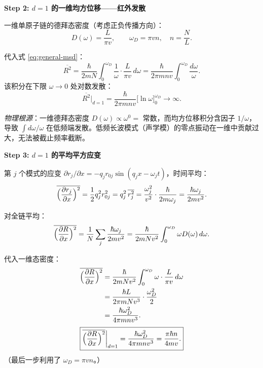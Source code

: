\begin{derivationbox}[标准解题过程]
\textbf{Step 2: $d=1$ 的一维均方位移——红外发散}

一维单原子链的德拜态密度（考虑正负传播方向）：
\begin{equation}
D(\omega) = \frac{L}{\pi v}, \qquad \omega_D = \pi vn, \quad n=\frac{N}{L}.
\end{equation}

代入式 \eqref{eq:general-msd}：
\begin{equation}
\overline{R^2} = \frac{\hbar}{2mN}\int_0^{\omega_D}\frac{1}{\omega}\cdot\frac{L}{\pi v}\,d\omega = \frac{\hbar}{2\pi mnv}\int_0^{\omega_D}\frac{d\omega}{\omega}.
\end{equation}
该积分在下限 $\omega\to0$ 处对数发散：
\begin{equation}
\boxed{\overline{R^2}\big|_{d=1} = \frac{\hbar}{2\pi mnv}\bigl[\ln\omega\bigr]_0^{\omega_D} \to \infty.}
\end{equation}

\textit{物理根源}：一维德拜态密度 $D(\omega)\propto\omega^0=$ 常数，而均方位移积分含因子 $1/\omega$，导致 $\int d\omega/\omega$ 在低频端发散。低频长波模式（声学模）的零点振动在一维中贡献过大，无法被截止频率截断。

\textbf{Step 3: $d=1$ 的平均平方应变}

第 $j$ 个模式的应变 $\partial r_j/\partial x = -q_j r_{0j}\sin(q_jx-\omega_jt)$，时间平均：
\begin{equation}
\overline{\Bigl(\frac{\partial r_j}{\partial x}\Bigr)^2} = \frac12 q_j^2 r_{0j}^2 = q_j^2\,\overline{r_j^2} = \frac{\omega_j^2}{v^2}\cdot\frac{\hbar}{2m\omega_j} = \frac{\hbar\omega_j}{2mv^2}.
\end{equation}

对全链平均：
\begin{equation}
\overline{\Bigl(\frac{\partial R}{\partial x}\Bigr)^2} = \frac{1}{N}\sum_j\frac{\hbar\omega_j}{2mv^2} = \frac{\hbar}{2mNv^2}\int_0^{\omega_D}\omega D(\omega)\,d\omega.
\end{equation}

代入一维态密度：
\begin{align}
    \overline{\Bigl(\frac{\partial R}{\partial x}\Bigr)^2} &= \frac{\hbar}{2mNv^2}\int_0^{\omega_D}\omega\cdot\frac{L}{\pi v}\,d\omega \nonumber\\
    &= \frac{\hbar L}{2\pi mNv^3}\cdot\frac{\omega_D^2}{2} \nonumber\\
    &= \frac{\hbar\omega_D^2}{4\pi mnv^3}.
\end{align}
\begin{equation}
\boxed{\overline{\Bigl(\frac{\partial R}{\partial x}\Bigr)^2}\bigg|_{d=1} = \frac{\hbar\omega_D^2}{4\pi mnv^3} = \frac{\pi\hbar n}{4m v}.}
\label{eq:1d-strain}
\end{equation}
（最后一步利用了 $\omega_D=\pi vn$。）
\end{derivationbox}

